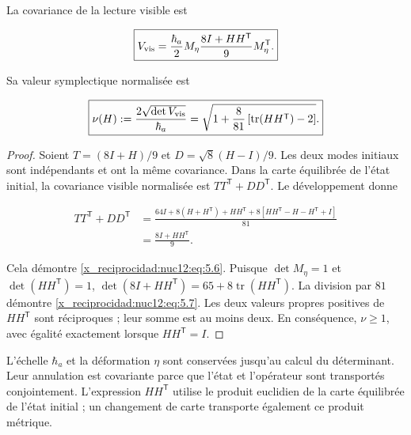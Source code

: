 \begin{theorem}

La covariance de la lecture visible est



\begin{equation}
\boxed{V_{\rm vis}=
\frac{\hbar_a}{2}M_\eta
\frac{8I+HH^{\mathsf T}}9
M_\eta^{\mathsf T}.}
\label{x_reciprocidad:nuc12:eq:5.6}
\end{equation}



Sa valeur symplectique normalisée est



\begin{equation}
\boxed{\nu(H):=\frac{2\sqrt{\det V_{\rm vis}}}{\hbar_a}
=\sqrt{1+\frac8{81}\left[\operatorname{tr}(HH^{\mathsf T})-2\right]}.}
\label{x_reciprocidad:nuc12:eq:5.7}
\end{equation}
\end{theorem}



\begin{proof}
Soient \(T=(8I+H)/9\) et \(D=\sqrt8(H-I)/9\). Les deux modes initiaux sont indépendants et ont la même covariance. Dans la carte équilibrée de l’état initial, la covariance visible normalisée est \(TT^{\mathsf T}+DD^{\mathsf T}\). Le développement donne




\[
\begin{aligned}
TT^{\mathsf T}+DD^{\mathsf T}
&=\frac{64I+8(H+H^{\mathsf T})+HH^{\mathsf T}
+8[HH^{\mathsf T}-H-H^{\mathsf T}+I]}{81}\\
&=\frac{8I+HH^{\mathsf T}}9.
\end{aligned}
\]



Cela démontre \eqref{x_reciprocidad:nuc12:eq:5.6}. Puisque \(\det M_\eta=1\) et \(\det(HH^{\mathsf T})=1\),
\(\det(8I+HH^{\mathsf T})=65+8\operatorname{tr}(HH^{\mathsf T})\).
La division par \(81\) démontre \eqref{x_reciprocidad:nuc12:eq:5.7}. Les deux valeurs propres positives de \(HH^{\mathsf T}\) sont réciproques ; leur somme est au moins deux. En conséquence, \(\nu\geq1\), avec égalité exactement lorsque \(HH^{\mathsf T}=I\).
\end{proof}

L’échelle \(\hbar_a\) et la déformation \(\eta\) sont conservées jusqu’au calcul du déterminant. Leur annulation est covariante parce que l’état et l’opérateur sont transportés conjointement. L’expression \(HH^{\mathsf T}\) utilise le produit euclidien de la carte équilibrée de l’état initial ; un changement de carte transporte également ce produit métrique.


